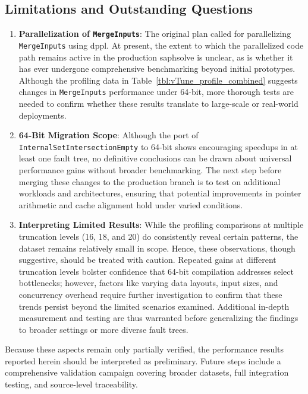 

\subsection{Limitations and Outstanding Questions}
\label{sec:limitations_saphsolve}

\begin{enumerate}
    \item \textbf{Parallelization of \texttt{MergeInputs}}: The original plan called for parallelizing \texttt{MergeInputs} using \acrshort{dppl}. At present, the extent to which the parallelized code path remains active in the production \acrshort{saphsolve} is unclear, as is whether it has ever undergone comprehensive benchmarking beyond initial prototypes. Although the profiling data in Table~\ref{tbl:vTune_profile_combined} suggests changes in \texttt{MergeInputs} performance under 64-bit, more thorough tests are needed to confirm whether these results translate to large-scale or real-world deployments.
    
    \item \textbf{64-Bit Migration Scope}: Although the port of \texttt{InternalSetIntersectionEmpty} to 64-bit shows encouraging speedups in at least one fault tree, no definitive conclusions can be drawn about universal performance gains without broader benchmarking. The next step before merging these changes to the production branch is to test on additional workloads and architectures, ensuring that potential improvements in pointer arithmetic and cache alignment hold under varied conditions.

    \item \textbf{Interpreting Limited Results}: While the profiling comparisons at multiple truncation levels (16, 18, and 20) do consistently reveal certain patterns, the dataset remains relatively small in scope. Hence, these observations, though suggestive, should be treated with caution. Repeated gains at different truncation levels bolster confidence that 64-bit compilation addresses select bottlenecks; however, factors like varying data layouts, input sizes, and concurrency overhead require further investigation to confirm that these trends persist beyond the limited scenarios examined. Additional in-depth measurement and testing are thus warranted before generalizing the findings to broader settings or more diverse fault trees.
\end{enumerate}

Because these aspects remain only partially verified, the performance results reported herein should be interpreted as preliminary.  Future steps include a comprehensive validation campaign covering broader datasets, full integration testing, and source-level traceability.